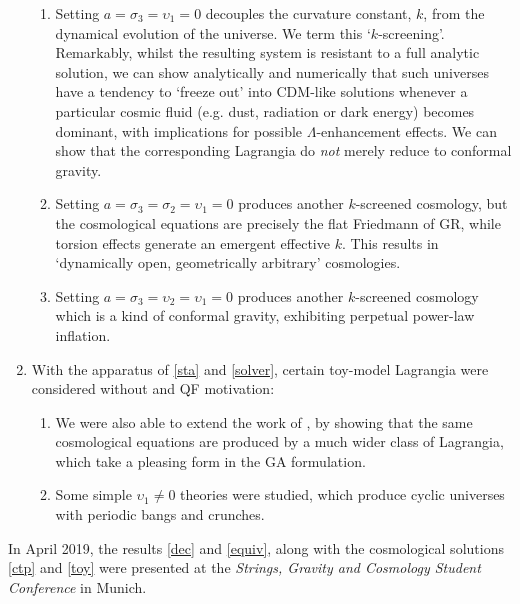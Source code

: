 \documentclass[twoside]{report}
\begin{document}
\begin{multicols}{2}
\begin{enumerate}[resume]
    \begin{enumerate}
      \item\label{D} Setting $a=\sigma_3=\upsilon_1=0$ decouples the curvature constant, $k$, from the dynamical evolution of the universe. We term this `$k$-screening'. Remarkably, whilst the resulting system is resistant to a full analytic solution, we can show analytically and numerically that such universes have a tendency to `freeze out' into \textLambda CDM-like solutions whenever a particular cosmic fluid (e.g. dust, radiation or dark energy) becomes dominant, with implications for possible $\Lambda$-enhancement effects. We can show that the corresponding Lagrangia do \textit{not} merely reduce to conformal gravity.
      \item\label{ek} Setting $a=\sigma_3=\sigma_2=\upsilon_1=0$ produces another $k$-screened cosmology, but the cosmological equations are precisely the flat Friedmann of GR, while torsion effects generate an emergent effective $k$. This results in `dynamically open, geometrically arbitrary' cosmologies.
      \item\label{inf} Setting $a=\sigma_3=\upsilon_2=\upsilon_1=0$ produces another $k$-screened cosmology which is a kind of conformal gravity, exhibiting perpetual power-law inflation. 
    \end{enumerate}
  \item\label{toy} With the apparatus of \ref{sta} and \ref{solver}, certain toy-model Lagrangia were considered without and QF motivation:
    \begin{enumerate}[resume]
      \item We were also able to extend the work of \cite{lasenby-doran-heineke-2005}, by showing that the same cosmological equations are produced by a much wider class of Lagrangia, which take a pleasing form in the GA formulation.
      \item Some simple $\upsilon_1\neq 0$ theories were studied, which produce cyclic universes with periodic bangs and crunches.
  \end{enumerate}
\end{enumerate}
In April 2019, the results \ref{dec} and \ref{equiv}, along with the cosmological solutions \ref{ctp} and \ref{toy} were presented \cite{poster} at the \textit{Strings, Gravity and Cosmology Student Conference} in Munich.


\end{multicols}
\end{document}
